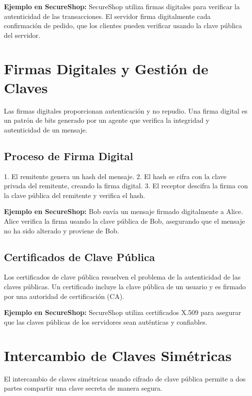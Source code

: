 \textbf{Ejemplo en SecureShop:} SecureShop utiliza firmas digitales para verificar la autenticidad de las transacciones. El servidor firma digitalmente cada confirmación de pedido, que los clientes pueden verificar usando la clave pública del servidor.

\section{Firmas Digitales y Gestión de Claves}

Las firmas digitales proporcionan autenticación y no repudio. Una firma digital es un patrón de bits generado por un agente que verifica la integridad y autenticidad de un mensaje.

\subsection{Proceso de Firma Digital}

1. El remitente genera un hash del mensaje.
2. El hash se cifra con la clave privada del remitente, creando la firma digital.
3. El receptor descifra la firma con la clave pública del remitente y verifica el hash.

\textbf{Ejemplo en SecureShop:} Bob envía un mensaje firmado digitalmente a Alice. Alice verifica la firma usando la clave pública de Bob, asegurando que el mensaje no ha sido alterado y proviene de Bob.

\subsection{Certificados de Clave Pública}

Los certificados de clave pública resuelven el problema de la autenticidad de las claves públicas. Un certificado incluye la clave pública de un usuario y es firmado por una autoridad de certificación (CA).

\textbf{Ejemplo en SecureShop:} SecureShop utiliza certificados X.509 para asegurar que las claves públicas de los servidores sean auténticas y confiables.

\section{Intercambio de Claves Simétricas}

El intercambio de claves simétricas usando cifrado de clave pública permite a dos partes compartir una clave secreta de manera segura.

